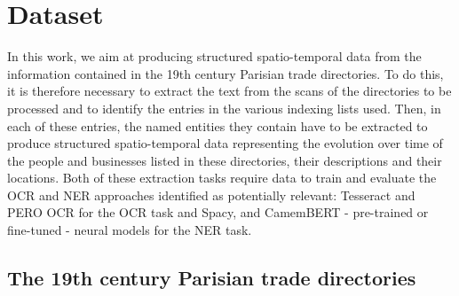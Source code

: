\section{Dataset}

In this work, we  aim  at  producing  structured  spatio-temporal  data  from the information contained in the 19th century Parisian trade directories.
To do this, it is therefore necessary to extract the text from the scans of the directories to be processed and to identify the entries in the various indexing lists used.
Then, in each of these entries, the named entities they contain have to be extracted to produce structured spatio-temporal data representing the evolution over time of the people and businesses listed in these directories, their descriptions and their locations.
Both of these extraction tasks require data to train and evaluate the OCR and NER approaches identified as potentially relevant: Tesseract and PERO OCR for the OCR task and Spacy, and CamemBERT - pre-trained or fine-tuned - neural models for the NER task.

\subsection{The 19th century Parisian trade directories}

